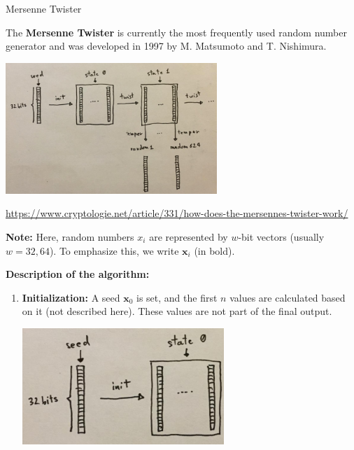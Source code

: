 









\begin{vbframe}{Mersenne Twister}

The \textbf{Mersenne Twister} is currently the most frequently used random number generator and was developed in 1997 by M. Matsumoto and T. Nishimura.

\begin{center}
\includegraphics[width = 0.6\textwidth]{figure_man/mersenne.png} \\
\begin{footnotesize}
\url{https://www.cryptologie.net/article/331/how-does-the-mersennes-twister-work/}
\end{footnotesize}
\end{center}


\framebreak

\begin{small}
	\textbf{Note:} Here, random numbers $x_i$ are represented by $w$-bit vectors (usually $w = 32, 64$). To emphasize this, we write $\mathbf{x}_i$ (in bold).
\end{small}

\vspace*{0.2cm}

\textbf{Description of the algorithm:}
\begin{enumerate}
\item \textbf{Initialization: } A seed $\mathbf{x}_0$ is set, and the first $n$ values are calculated based on it (not described here). These values are not part of the final output.
\vspace*{0.2cm}
\begin{center}
\includegraphics[width = 0.6\textwidth]{figure_man/mersenneinit.png}
\end{center}


\end{enumerate}
\end{vbframe}
